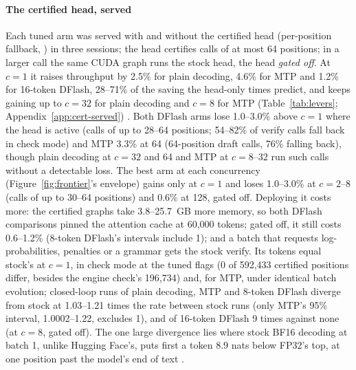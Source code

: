 \paragraph{The certified head, served} Each tuned arm was served with and without the certified head (per-position fallback, \modelcons{}) in three sessions; the head certifies calls of at most 64 positions; in a larger call the same CUDA graph runs the stock head, the head \emph{gated off}. At $c=1$ it raises throughput by 2.5\% for plain decoding, 4.6\% for MTP and 1.2\% for 16-token DFlash, 28--71\% of the saving the head-only times predict, and keeps gaining up to $c=32$ for plain decoding and $c=8$ for MTP (Table~\ref{tab:levers}; Appendix~\ref{app:cert-served}) . Both DFlash arms lose 1.0--3.0\% above $c=1$ where the head is active (calls of up to 28--64 positions; 54--82\% of verify calls fall back in check mode) and MTP 3.3\% at 64 (64-position draft calls, 76\% falling back), though plain decoding at $c=32$ and 64 and MTP at $c=8$--32 run such calls without a detectable loss. The best arm at each concurrency (Figure~\ref{fig:frontier}'s envelope) gains only at $c=1$ and loses 1.0--3.0\% at $c=2$--8 (calls of up to 30--64 positions) and 0.6\% at 128, gated off. Deploying it costs more: the certified graphs take 3.8--25.7~GB more memory, so both DFlash comparisons pinned the attention cache at 60,000 tokens; gated off, it still costs 0.6--1.2\% (8-token DFlash's intervals include 1); and a batch that requests log-probabilities, penalties or a grammar gets the stock verify. Its tokens equal stock's at $c=1$, in check mode at the tuned flags (0 of 592,433 certified positions differ, besides the engine check's 196,734) and, for MTP, under identical batch evolution; closed-loop runs of plain decoding, MTP and 8-token DFlash diverge from stock at 1.03--1.21 times the rate between stock runs (only MTP's 95\% interval, 1.0002--1.22, excludes 1), and of 16-token DFlash 9 times against none (at $c=8$, gated off). The one large divergence lies where stock BF16 decoding at batch 1, unlike Hugging Face's, puts first a token 8.9 nats below FP32's top, at one position past the model's end of text .
